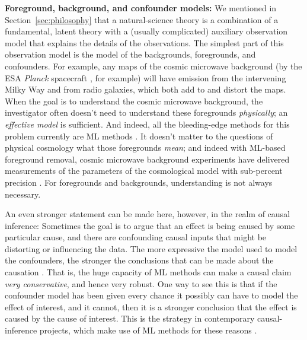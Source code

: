 \documentclass{article}
\renewcommand{\paragraph}[1]{\noindent\par\textbf{#1}}
\newcommand{\sectionname}{Section}
\newcommand{\secref}[1]{\sectionname~\ref{#1}}
\begin{document}
\paragraph{Foreground, background, and confounder models:}
We mentioned in \secref{sec:philosophy} that a natural-science theory is a combination of a fundamental, latent theory with a (usually complicated) auxiliary observation model that explains the details of the observations.
The simplest part of this observation model is the model of the backgrounds, foregrounds, and confounders.
For example, any maps of the cosmic microwave background (by the ESA \textsl{Planck} spacecraft \cite{planck_maps}, for example) will have emission from the intervening Milky Way and from radio galaxies, which both add to and distort the maps.
When the goal is to understand the cosmic microwave background, the investigator often doesn't need to understand these foregrounds \emph{physically}; an \emph{effective model} is sufficient.
And indeed, all the bleeding-edge methods for this problem currently are ML methods \cite{cmb_foregrounds}.
It doesn't matter to the questions of physical cosmology what those foregrounds \emph{mean}; and indeed with ML-based foreground removal, cosmic microwave background experiments have delivered measurements of the parameters of the cosmological model with sub-percent precision \cite{planck_parameters}.
For foregrounds and backgrounds, understanding is not always necessary.

An even stronger statement can be made here, however, in the realm of causal inference:
Sometimes the goal is to argue that an effect is being caused by some particular cause, and there are confounding causal inputs that might be distorting or influencing the data.
The more expressive the model used to model the confounders, the stronger the conclusions that can be made about the causation \cite{causal_inference}.
That is, the huge capacity of ML methods can make a causal claim \emph{very conservative}, and hence very robust.
One way to see this is that if the confounder model has been given every chance it possibly can have to model the effect of interest, and it cannot, then it is a stronger conclusion that the effect is caused by the cause of interest.
This is the strategy in contemporary causal-inference projects, which make use of ML methods for these reasons \cite{bart}.
\end{document}
